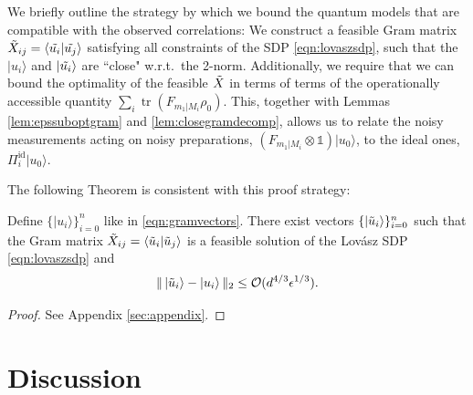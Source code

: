 We briefly outline the strategy by which we bound the quantum models that are compatible with the observed correlations: We construct a feasible Gram matrix $\Tilde{X}_{ij}=\langle \Tilde{u_i}\vert \Tilde{u_j}\rangle$ satisfying all constraints of the SDP \ref{eqn:lovaszsdp}, such that the $\vert u_i \rangle$ and $\vert \Tilde{u_i}\rangle$ are ``close" w.r.t.\ the 2-norm. Additionally, we require that we can bound the optimality of the feasible $\Tilde{X}$ in terms of terms of the operationally accessible quantity $\sum_i \operatorname{tr}(F_{m_1\vert M_i}\rho_0)$. This, together with Lemmas \ref{lem:epssuboptgram} and \ref{lem:closegramdecomp}, allows us to relate the noisy measurements acting on noisy preparations, $(F_{m_1\vert M_i}\otimes \mathbb{1})\vert u_0 \rangle$, to the ideal ones, $\Pi_i^{\text{id}}\vert u_0 \rangle$. 

The following Theorem is consistent with this proof strategy:
\begin{theorem}
Define $\{\vert u_i \rangle \}_{i=0}^n$ like in \ref{eqn:gramvectors}. There exist vectors $\{\vert \Tilde{u}_i \rangle \}_{i=0}^n$ such that the Gram matrix $\Tilde{X}_{ij}=\langle \Tilde{u}_i\vert \Tilde{u}_j \rangle$ is a feasible solution of the Lovász SDP \ref{eqn:lovaszsdp} and
\begin{equation*}
\| \,\vert \Tilde{u}_i \rangle - \vert u_i \rangle\, \|_2 \leq \mathcal{O}(d^{4/3}\epsilon^{1/3}).
\end{equation*}
\end{theorem}
\begin{proof}
See Appendix \ref{sec:appendix}.
\end{proof}




\section{Discussion}
\label{sec:discussion}